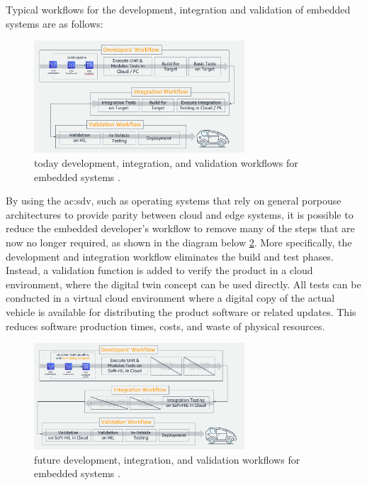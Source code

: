 Typical workflows for the development, integration and validation of embedded systems are as follows:
\begin{figure}[h]  %
    \centering
    \includegraphics[width=0.7\textwidth]{images/today_developer_workflow.png}  %
    \caption{today development, integration, and validation workflows for embedded systems \cite{DevelopersWorkflow}.}
    \label{fig:TodayDeveloperWorkflow}
\end{figure}

By using the \gls{ac:sdv}, such as operating systems that rely on general porpouse architectures to provide parity between cloud and edge systems, it is possible to reduce the embedded developer's workflow to remove many of the steps that are now no longer required, as shown in the diagram below \ref{fig:FutureDevelopersWorkflow}. More specifically, the development and integration workflow eliminates the build and test phases. Instead, a validation function is added to verify the product in a cloud environment, where the digital twin concept can be used directly. All tests can be conducted in a virtual cloud environment where a digital copy of the actual vehicle is available for distributing the product software or related updates. This reduces software production times, costs, and waste of physical resources.
\begin{figure}[h]  %
    \centering
    \includegraphics[width=0.7\textwidth]{images/future_developers_workflow.png}  %
    \caption{future development, integration, and validation workflows for embedded systems \cite{DevelopersWorkflow}.}
    \label{fig:FutureDevelopersWorkflow}
\end{figure}

